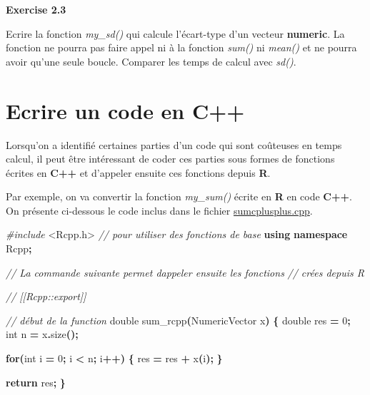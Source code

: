 \documentclass[
]{book}
\newenvironment{Shaded}{\begin{snugshade}}{\end{snugshade}}
\newcommand{\CommentTok}[1]{\textcolor[rgb]{0.56,0.35,0.01}{\textit{#1}}}
\newcommand{\ControlFlowTok}[1]{\textcolor[rgb]{0.13,0.29,0.53}{\textbf{#1}}}
\newcommand{\DataTypeTok}[1]{\textcolor[rgb]{0.13,0.29,0.53}{#1}}
\newcommand{\DecValTok}[1]{\textcolor[rgb]{0.00,0.00,0.81}{#1}}
\newcommand{\ImportTok}[1]{#1}
\newcommand{\KeywordTok}[1]{\textcolor[rgb]{0.13,0.29,0.53}{\textbf{#1}}}
\newcommand{\NormalTok}[1]{#1}
\newcommand{\OperatorTok}[1]{\textcolor[rgb]{0.81,0.36,0.00}{\textbf{#1}}}
\newcommand{\PreprocessorTok}[1]{\textcolor[rgb]{0.56,0.35,0.01}{\textit{#1}}}
\theoremstyle{definition}
\theoremstyle{definition}
\theoremstyle{definition}
\theoremstyle{definition}
\theoremstyle{remark}
\begin{document}
\textbf{Exercise 2.3}

Ecrire la fonction \emph{my\_sd()} qui calcule l'écart-type d'un vecteur \textbf{numeric}. La fonction ne pourra pas faire appel ni à la fonction \emph{sum()} ni \emph{mean()} et ne pourra avoir qu'une seule boucle. Comparer les temps de calcul avec \emph{sd()}.

\hypertarget{ecrire-un-code-en-c}{%
\section{Ecrire un code en C++}\label{ecrire-un-code-en-c}}

Lorsqu'on a identifié certaines parties d'un code qui sont coûteuses en temps calcul, il peut être intéressant de coder ces parties sous formes de fonctions écrites en \textbf{C++} et d'appeler ensuite ces fonctions depuis \textbf{R}.

Par exemple, on va convertir la fonction \emph{my\_sum()} écrite en \textbf{R} en code \textbf{C++}. On présente ci-dessous le code inclus dans le fichier \href{R/sumcplusplus.cpp}{sumcplusplus.cpp}.

\begin{Shaded}
\begin{Highlighting}[]
\PreprocessorTok{\#include }\ImportTok{\textless{}Rcpp.h\textgreater{}}\PreprocessorTok{ }\CommentTok{// pour utiliser des fonctions de base}
\KeywordTok{using} \KeywordTok{namespace}\NormalTok{ Rcpp}\OperatorTok{;}

\CommentTok{// La commande suivante permet d\textquotesingle{}appeler ensuite les fonctions }
\CommentTok{// crées depuis R}

\CommentTok{// [[Rcpp::export]] }

\CommentTok{// début de la function}
\DataTypeTok{double}\NormalTok{ sum\_rcpp}\OperatorTok{(}\NormalTok{NumericVector x}\OperatorTok{)} \OperatorTok{\{}
  \DataTypeTok{double}\NormalTok{ res }\OperatorTok{=} \DecValTok{0}\OperatorTok{;}
  \DataTypeTok{int}\NormalTok{ n }\OperatorTok{=}\NormalTok{ x}\OperatorTok{.}\NormalTok{size}\OperatorTok{();}
  
  \ControlFlowTok{for}\OperatorTok{(}\DataTypeTok{int}\NormalTok{ i }\OperatorTok{=} \DecValTok{0}\OperatorTok{;}\NormalTok{ i }\OperatorTok{\textless{}}\NormalTok{ n}\OperatorTok{;}\NormalTok{ i}\OperatorTok{++)} \OperatorTok{\{}
\NormalTok{    res }\OperatorTok{=}\NormalTok{ res }\OperatorTok{+}\NormalTok{ x}\OperatorTok{(}\NormalTok{i}\OperatorTok{);}
  \OperatorTok{\}}
        
  \ControlFlowTok{return}\NormalTok{ res}\OperatorTok{;}
\OperatorTok{\}}
\end{Highlighting}
\end{Shaded}
\end{document}
